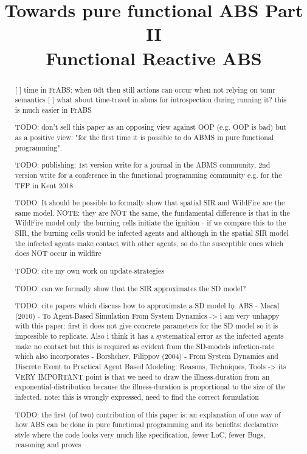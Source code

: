 \documentclass[10pt, conference]{../../templates/IEEEtran/IEEEtran}
\title{Towards pure functional ABS Part II\\{\subtitlefont Functional Reactive ABS}}
\author{
	\IEEEauthorblockN{Jonathan Thaler}
	\IEEEauthorblockA{School of Computer Science\\
		University of Nottingham\\
		jonathan.thaler@nottingham.ac.uk}
		
	\and
		
	\IEEEauthorblockN{Peer-Olaf Siebers}
	\IEEEauthorblockA{School of Computer Science\\
		University of Nottingham\\
		peer-olaf.siebers@nottingham.ac.uk}
}
\begin{document}
\maketitle 

\begin{abstract}
[ ] time in FrABS: when 0dt then still actions can occur when not relying on tomr semantics
[ ] what about time-travel in abms for introspection during running it? this is much easier in FrABS

TODO: don't sell this paper as an opposing view against OOP (e.g. OOP is bad) but as a positive view: "for the first time it is possible to do ABMS in pure functional programming".

TODO: publishing: 1st version write for a journal in the ABMS community, 2nd version write for a conference in the functional programming community e.g. for the TFP in Kent 2018

TODO: It should be possible to formally show that spatial SIR and WildFire are the same model. NOTE: they are NOT the same, the fundamental difference is that in the WildFire model only the burning cells initiate the ignition - if we compare this to the SIR, the burning cells would be infected agents and although in the spatial SIR model the infected agents make contact with other agents, so do the susceptible ones which does NOT occur in wildfire

TODO: cite my own work on update-strategies

TODO: can we formally show that the SIR approximates the SD model?

TODO: cite papers which discuss how to approximate a SD model by ABS
- Macal (2010) - To Agent-Based Simulation From System Dynamics 
	-> i am very unhappy with this paper: first it does not give concrete parameters for the SD model so it is impossible to replicate. Also i think it has a systematical error as the infected agents make no contact but this is required as evident from the SD-models infection-rate which also incorporates
- Borshchev, Filippov (2004) - From System Dynamics and Discrete Event to Practical Agent Based Modeling: Reasons, Techniques, Tools
	-> its VERY IMPORTANT point is that we need to draw the illness-duration from an exponential-distribution because the illness-duration is proportional to the size of the infected. note: this is wrongly expressed, need to find the correct formulation

TODO: the first (of two) contribution of this paper is: an explanation of one way of how ABS can be done in pure functional programming and its benefits: declarative style where the code looks very much like specification, fewer LoC, fewer Bugs, reasoning and proves


\end{abstract}
\end{document}
